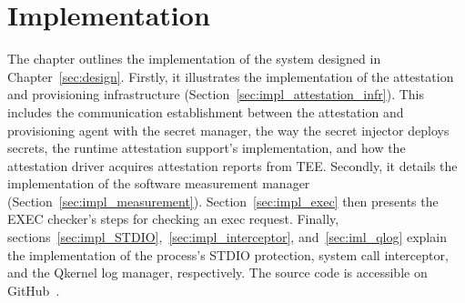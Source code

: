 \chapter{Implementation}
\label{sec:implementation}



The chapter outlines the implementation of the system designed in Chapter~\ref{sec:design}. Firstly, it illustrates the implementation of the attestation and provisioning infrastructure (Section~\ref{sec:impl_attestation_infr}). This includes the communication establishment between the 
attestation and provisioning agent with the secret manager, the way the secret injector deploys secrets, the runtime attestation support's implementation, and how the attestation driver acquires attestation reports from \acrshort{TEE}. Secondly, it details the implementation of the 
software measurement manager (Section~\ref{sec:impl_measurement}). Section~\ref{sec:impl_exec} then presents the EXEC checker's steps for checking an exec request. Finally, sections~\ref{sec:impl_STDIO},~\ref{sec:impl_interceptor}, and~\ref{sec:iml_qlog} explain the implementation of the process's STDIO 
protection, system call interceptor, and the Qkernel log manager, respectively. The source code is accessible on GitHub~\cite*{theis_source_code}.

